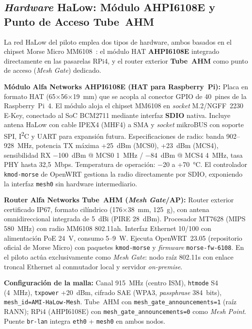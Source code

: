 \subsection{\emph{Hardware} HaLow: Módulo AHPI6108E y Punto de Acceso Tube~AHM}
\label{sec:gateway-halow-alfa}

La red HaLow del piloto emplea dos tipos de hardware, ambos basados en el chipset Morse Micro MM6108~\cite{morsemicroMM8108ProductBrief2025}: el módulo HAT \textbf{AHPI6108E} integrado directamente en las pasarelas RPi4, y el router exterior \textbf{Tube~AHM} como punto de acceso (\emph{Mesh Gate}) dedicado.

\textbf{Módulo Alfa Networks AHPI6108E (HAT para Raspberry~Pi):}  Placa en formato HAT (65$\times$56$\times$19~mm) que se acopla al conector GPIO de 40~pines de la Raspberry~Pi~4.  El módulo aloja el chipset MM6108 en \emph{socket} M.2/NGFF~2230 E-Key, conectado al SoC BCM2711 mediante interfaz \textbf{SDIO} nativa.  Incluye antena HaLow con cable IPEX4 (MHF4) a SMA y \emph{socket} mikroBUS con soporte SPI, I\textsuperscript{2}C y UART para expansión futura.  Especificaciones de radio: banda 902--928~MHz, potencia TX máxima +25~dBm (MCS0), +23~dBm (MCS4), sensibilidad RX $-$100~dBm @ MCS0 1~MHz / $-$84~dBm @ MCS4 4~MHz, tasa PHY hasta 32,5~Mbps.  Temperatura de operación: $-$20 a +70~°C.  El controlador \texttt{kmod-morse} de OpenWRT gestiona la radio directamente por SDIO, exponiendo la interfaz \texttt{mesh0} sin hardware intermediario.

\textbf{Router Alfa Networks Tube~AHM (\emph{Mesh Gate}/AP):}  Router exterior certificado IP67, formato cilíndrico (176$\times$38~mm, 125~g), con antena omnidireccional integrada de 5~dBi (PIRE 28~dBm).  Procesador MT7628 (MIPS 580~MHz) con radio MM6108 802.11ah.  Interfaz Ethernet 10/100 con alimentación PoE 24~V, consumo 5--9~W.  Ejecuta OpenWRT~23.05 (repositorio oficial de Morse Micro) con paquetes \texttt{kmod-morse} y \emph{firmware} \texttt{morse-fw-6108}.  En el piloto actúa exclusivamente como \emph{Mesh Gate}: nodo raíz 802.11s con enlace troncal Ethernet al conmutador local y servidor \emph{on-premise}.



\textbf{Configuración de la malla:} Canal 915~MHz (centro ISM), \texttt{htmode} S4 (4~MHz), \texttt{txpower} +20~dBm, cifrado SAE (WPA3, \emph{passphrase} 384~bits), \texttt{mesh\_id=AMI-HaLow-Mesh}.  Tube~AHM con \texttt{mesh\_gate\_announcements=1} (raíz RANN); RPi4 (AHPI6108E) con \texttt{mesh\_gate\_announcements=0} como \emph{Mesh Point}.  Puente \texttt{br-lan} integra \texttt{eth0} + \texttt{mesh0} en ambos nodos.

